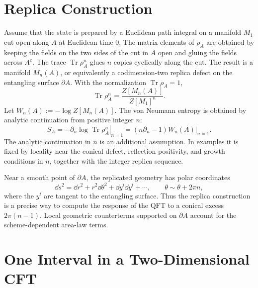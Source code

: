 \section{Replica Construction}

Assume that the state is prepared by a Euclidean path integral on a manifold
\(M_1\) cut open along \(A\) at Euclidean time \(0\).  The matrix elements of
\(\rho_A\) are obtained by keeping the fields on the two sides of the cut in
\(A\) open and gluing the fields across \(A^c\).  The trace
\(\operatorname{Tr}\rho_A^n\) glues \(n\) copies cyclically along the cut.  The
result is a manifold \(M_n(A)\), or equivalently a codimension-two replica
defect on the entangling surface \(\partial A\).  With the normalization
\(\operatorname{Tr}\rho_A=1\),
\begin{equation}
  \operatorname{Tr}\rho_A^n
  =
  \frac{Z[M_n(A)]}{Z[M_1]^n}.
  \label{eq:replica-partition-function}
\end{equation}
Let \(W_n(A):=-\log Z[M_n(A)]\).  The von Neumann entropy is obtained by
analytic continuation from positive integer \(n\):
\begin{equation}
  S_A
  =
  -\left.
  \partial_n\log\operatorname{Tr}\rho_A^n
  \right|_{n=1}
  =
  \left.
  (n\partial_n-1)W_n(A)
  \right|_{n=1}.
  \label{eq:replica-entropy-from-effective-action}
\end{equation}
The analytic continuation in \(n\) is an additional assumption.  In examples
it is fixed by locality near the conical defect, reflection positivity, and
growth conditions in \(n\), together with the integer replica sequence.

Near a smooth point of \(\partial A\), the replicated geometry has polar
coordinates
\[
  \dd s^2
  =
  \dd r^2+r^2\dd\theta^2+\dd y^i\dd y^i+\cdots,
  \qquad
  \theta\sim\theta+2\pi n,
\]
where the \(y^i\) are tangent to the entangling surface.  Thus the replica
construction is a precise way to compute the response of the QFT to a conical
excess \(2\pi(n-1)\).  Local geometric counterterms supported on
\(\partial A\) account for the scheme-dependent area-law terms.

\section{One Interval in a Two-Dimensional CFT}

